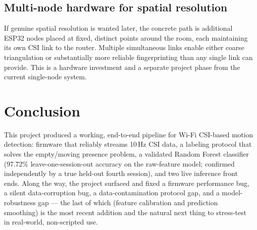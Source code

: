 \documentclass[11pt,a4paper]{article}
\begin{document}
\subsection{Multi-node hardware for spatial resolution}

If genuine spatial resolution is wanted later, the concrete path is
additional ESP32 nodes placed at fixed, distinct points around the room,
each maintaining its own CSI link to the router. Multiple simultaneous
links enable either coarse triangulation or substantially more reliable
fingerprinting than any single link can provide. This is a hardware
investment and a separate project phase from the current single-node
system.

\section{Conclusion}

This project produced a working, end-to-end pipeline for Wi-Fi
CSI-based motion detection: firmware that reliably streams 10\,Hz CSI
data, a labeling protocol that solves the empty/moving presence problem,
a validated Random Forest classifier (97.72\% leave-one-session-out
accuracy on the raw-feature model; confirmed independently by a true
held-out fourth session), and two live inference front ends. Along the
way, the project surfaced and fixed a firmware performance bug, a
silent data-corruption bug, a data-contamination protocol gap, and a
model-robustness gap --- the last of which (feature calibration and
prediction smoothing) is the most recent addition and the natural
next thing to stress-test in real-world, non-scripted use.
\end{document}
